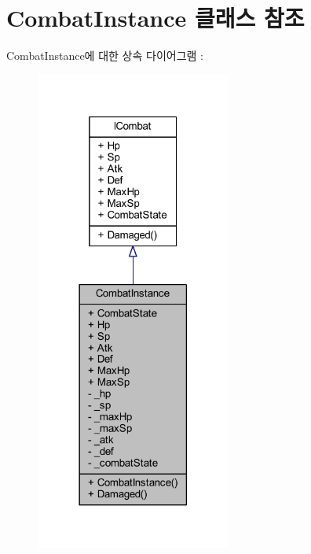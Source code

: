 \hypertarget{class_combat_instance}{}\section{Combat\+Instance 클래스 참조}
\label{class_combat_instance}


Combat\+Instance에 대한 상속 다이어그램 \+: 
\nopagebreak
\begin{figure}[H]
\begin{center}
\leavevmode
\includegraphics[width=182pt]{class_combat_instance__inherit__graph}
\end{center}
\end{figure}


